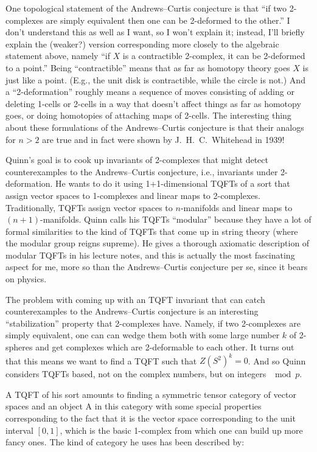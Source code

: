 \documentclass{article}
\begin{document}
One topological statement of the Andrews--Curtis conjecture is that ``if
two 2-complexes are simply equivalent then one can be 2-deformed to the
other.'' I don't understand this as well as I want, so I won't explain
it; instead, I'll briefly explain the (weaker?) version corresponding
more closely to the algebraic statement above, namely ``if \(X\) is a
contractible 2-complex, it can be 2-deformed to a point.'' Being
``contractible'' means that as far as homotopy theory goes \(X\) is just
like a point. (E.g., the unit disk is contractible, while the circle is
not.) And a ``2-deformation'' roughly means a sequence of moves
consisting of adding or deleting 1-cells or 2-cells in a way that
doesn't affect things as far as homotopy goes, or doing homotopies of
attaching maps of 2-cells. The interesting thing about these
formulations of the Andrews--Curtis conjecture is that their analogs for
\(n > 2\) are true and in fact were shown by J.\ H.\ C.\ Whitehead in 1939!

Quinn's goal is to cook up invariants of 2-complexes that might detect
counterexamples to the Andrews--Curtis conjecture, i.e., invariants under
2-deformation. He wants to do it using 1+1-dimensional TQFTs of a sort
that assign vector spaces to 1-complexes and linear maps to 2-complexes.
Traditionally, TQFTs assign vector spaces to \(n\)-manifolds and linear
maps to \((n+1)\)-manifolds. Quinn calls his TQFTs ``modular'' because
they have a lot of formal similarities to the kind of TQFTs that come up
in string theory (where the modular group reigns supreme). He gives a
thorough axiomatic description of modular TQFTs in his lecture notes,
and this is actually the most fascinating aspect for me, more so than
the Andrews--Curtis conjecture per se, since it bears on physics.

The problem with coming up with an TQFT invariant that can catch
counterexamples to the Andrews--Curtis conjecture is an interesting
``stabilization'' property that 2-complexes have. Namely, if two
2-complexes are simply equivalent, one can can wedge them both with some
large number \(k\) of 2-spheres and get complexes which are 2-deformable
to each other. It turns out that this means we want to find a TQFT such
that \(Z(S^2)^k = 0\). And so Quinn considers TQFTs based, not on the
complex numbers, but on integers \(\mod p\).

A TQFT of his sort amounts to finding a symmetric tensor category of
vector spaces and an object A in this category with some special
properties corresponding to the fact that it is the vector space
corresponding to the unit interval \([0,1]\), which is the basic
1-complex from which one can build up more fancy ones. The kind of
category he uses has been described by:
\end{document}
